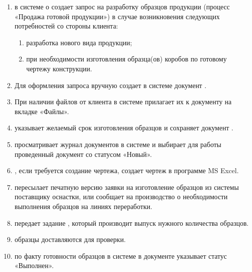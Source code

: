  \begin{enumerate}
 \item \manager  в системе  \gofro о создает запрос на разработку образцов продукции (процесс «Продажа готовой продукции») в случае возникновения следующих потребностей со стороны клиента:

 \begin{enumerate}
\item 	разработка нового вида продукции;
\item  при необходимости изготовления образца(ов) коробов по готовому чертежу конструкции.


 \end{enumerate}
 \item	Для оформления запроса \manager вручную создает  в системе  \gofro документ  .
 \item	При наличии файлов от клиента \manager в системе \gofro прилагает их к документу  на вкладке «Файлы».
 \item	\manager указывает желаемый срок изготовления образцов и сохраняет документ .
\item	\constructor просматривает журнал документов   в системе  \gofro и выбирает для работы проведенный документ со статусом «Новый».
\item	\constructor, если требуется создание чертежа, создает чертеж в  программе MS Excel.
\item	\constructor пересылает печатную версию заявки на изготовление образцов из системы  \gofro   поставщику оснастки, или сообщает на производство о необходимости выполнения образцов на линиях переработки.
\item	\master передает задание \operator, который производит выпуск нужного количества образцов.
\item образцы доставляются \constructor для проверки. 
\item	\constructor по факту готовности образцов в системе \gofro  в документе  указывает статус «Выполнен».

 \end{enumerate}



